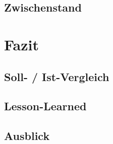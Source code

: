 \documentclass[12pt, xcolor=dvipsnames]{scrartcl}
\begin{document}
\subsection{Zwischenstand}

\section{Fazit}

\subsection{Soll- / Ist-Vergleich}

\subsection{Lesson-Learned}

\subsection{Ausblick}

\newpage


\end{document}
